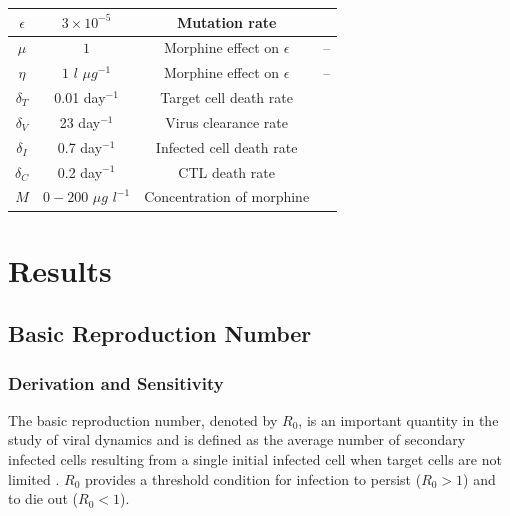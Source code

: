 \documentclass[11pt, oneside]{article}    %
\begin{document}
\begin{table}[H]
\begin{tabular}{|c|c|c|c|}
\hline
$\epsilon$ & $3 \times 10^{-5}$ & Mutation rate & \cite{Mansky}\\
\hline
$\mu$ & $1$ & Morphine effect on $\epsilon$ & --\\
\hline
$\eta$ & $1$ $l$ $\mu g ^{-1}$ & Morphine effect on $\epsilon$ & -- \\
\hline
$\delta_T$ & 0.01 day$^{-1}$ & Target cell death rate & \cite{Stafford} \\
\hline
$\delta_V$ & 23 day$^{-1}$ & Virus clearance rate & \cite{Ramratnam} \\
\hline
$\delta_I$ & 0.7 day$^{-1}$ & Infected cell death rate & \cite{Vaidya}\\
\hline
$\delta_C$ & 0.2 day$^{-1}$ & CTL death rate & \cite{De Boer}\\
\hline
$M$ & $0-200$ $\mu g$ $l^{-1}$ & Concentration of morphine & \cite{Olkkola}\\
\hline
\end{tabular}
\end{table}


\section{Results}
\subsection{Basic Reproduction Number}
\subsubsection{Derivation and Sensitivity}

The basic reproduction number, denoted by $R_0$, is an important quantity in the study of viral dynamics and is defined as the average number of secondary infected cells resulting from a single initial infected cell when target cells are not limited \cite{Castillo-Chavez}. $R_0$ provides a threshold condition for infection to persist ($R_0 > 1$) and to die out ($R_0 < 1$).

\end{document}
